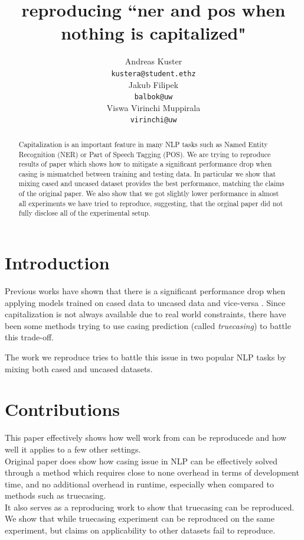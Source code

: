 \documentclass[11pt,a4paper]{article}
\title{reproducing ``ner and pos when nothing is capitalized"}
\author{Andreas Kuster \\
    {\tt kustera@student.ethz} \\\And
    Jakub Filipek \\
    {\tt balbok@uw} \\\And
    Viswa Virinchi Muppirala \\
    {\tt virinchi@uw}}
\date{}
\begin{document}
\maketitle
\begin{abstract}
    Capitalization is an important feature in many NLP tasks such as Named Entity Recognition (NER) or Part of Speech Tagging (POS). We are trying to reproduce results of paper which shows how to mitigate a significant performance drop when casing is mismatched between training and testing data. In particular we show that mixing cased and uncased dataset provides the best performance, matching the claims of the original paper. We also show that we got slightly lower performance in almost all experiments we have tried to reproduce, suggesting, that the orginal paper did not fully disclose all of the experimental setup.
\end{abstract}

\section{Introduction}
Previous works have shown that there is a significant performance drop when applying models trained on cased data to uncased data and vice-versa \cite{wang-etal-2006-capitalizing}. Since capitalization is not always available due to real world constraints, there have been some methods trying to use casing prediction (called \textit{truecasing}) to battle this trade-off.

The work we reproduce tries to battle this issue in two popular NLP tasks by mixing both cased and uncased datasets.

\section{Contributions}
This paper effectively shows how well work from \cite{ner-and-pos-original} can be reproducede and how well it applies to a few other settings.\\
Original paper does show how casing issue in NLP can be effectively solved through a method which requires close to none overhead in terms of development time, and no additional overhead in runtime, especially when compared to methods such as truecasing.\\
It also serves as a reproducing work to show that truecasing can be reproduced. We show that while truecasing experiment can be reproduced on the same experiment, but claims on applicability to other datasets fail to reproduce.
\end{document}

